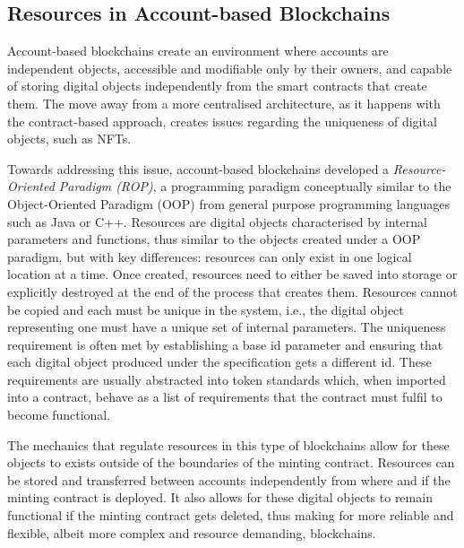 \documentclass[../main.tex]{subfiles}
\begin{document}
\subsection{Resources in Account-based Blockchains}
\label{sec:resources_account_blockchains}
Account-based blockchains create an environment where accounts are independent objects, accessible and modifiable only by their owners, and capable of storing digital objects independently from the smart contracts that create them. The move away from a more centralised architecture, as it happens with the contract-based approach, creates issues regarding the uniqueness of digital objects, such as NFTs.
\par
Towards addressing this issue, account-based blockchains developed a \textit{Resource-Oriented Paradigm (ROP)}, a programming paradigm conceptually similar to the Object-Oriented Paradigm (OOP) from general purpose programming languages such as Java or C++. Resources are digital objects characterised by internal parameters and functions, thus similar to the objects created under a OOP paradigm, but with key differences: resources can only exist in one logical location at a time. Once created, resources need to either be saved into storage or explicitly destroyed at the end of the process that creates them. Resources cannot be copied and each must be unique in the system, i.e., the digital object representing one must have a unique set of internal parameters. The uniqueness requirement is often met by establishing a base id parameter and ensuring that each digital object produced under the specification gets a different id. These requirements are usually abstracted into token standards which, when imported into a contract, behave as a list of requirements that the contract must fulfil to become functional.
\par
The mechanics that regulate resources in this type of blockchains allow for these objects to exists outside of the boundaries of the minting contract. Resources can be stored and transferred between accounts independently from where and if the minting contract is deployed. It also allows for these digital objects to remain functional if the minting contract gets deleted, thus making for more reliable and flexible, albeit more complex and resource demanding, blockchains.
\end{document}
